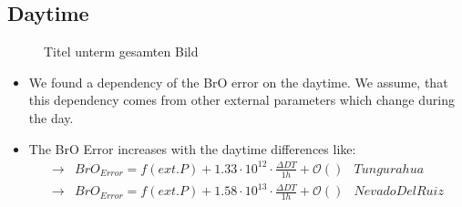 \documentclass  [
  paper    = a4,
  BCOR     = 10mm,
  twoside,
  fontsize = 12pt,
  fleqn,
  toc      = bibnumbered,
  toc      = listofnumbered,
  numbers  = noendperiod,
  headings = normal,
  listof   = leveldown,
  version  = 3.03
]                                       {scrreprt}
\begin{document}
	\subsection{Daytime}
	\begin{figure}[h!]			
		\caption{Titel unterm gesamten Bild}
	\end{figure}
	\begin{itemize}
		\item We found a dependency of the BrO error on the daytime. We assume, that this dependency comes from other external parameters which change during the day. 
		\item The BrO Error increases with the daytime differences like: \\
		\begin{align*}
		\rightarrow&  BrO_{Error} = f(ext. P)+1.33\cdot10^{12}\cdot\frac{\Delta DT}{1h}  + \mathcal{O}\left(\right)& Tungurahua\\
		\rightarrow&  BrO_{Error} = f(ext. P)+1.58\cdot10^{13}\cdot\frac{\Delta DT}{1h} + \mathcal{O}\left(\right) & Nevado Del Ruiz\\
		\end{align*}
		
	\end{itemize}
\end{document}
